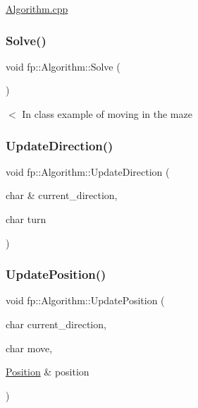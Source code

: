 \hyperlink{_algorithm_8cpp}{Algorithm.\+cpp} \mbox{\label{classfp_1_1_algorithm_ac6e4cae1f140d0155f2feaaaf1d287c1}} 
\subsubsection{\texorpdfstring{Solve()}{Solve()}}
{\footnotesize\ttfamily void fp\+::\+Algorithm\+::\+Solve (\begin{DoxyParamCaption}{ }\end{DoxyParamCaption})}

$<$ In class example of moving in the maze \mbox{\label{classfp_1_1_algorithm_ab91291b423ce58ba86e317112ca0c5ba}} 
\subsubsection{\texorpdfstring{Update\+Direction()}{UpdateDirection()}}
{\footnotesize\ttfamily void fp\+::\+Algorithm\+::\+Update\+Direction (\begin{DoxyParamCaption}\item[{char \&}]{current\+\_\+direction,  }\item[{char}]{turn }\end{DoxyParamCaption})}

\mbox{\label{classfp_1_1_algorithm_ad2d339d7e95c730bb5f44511fa3c1246}} 
\subsubsection{\texorpdfstring{Update\+Position()}{UpdatePosition()}}
{\footnotesize\ttfamily void fp\+::\+Algorithm\+::\+Update\+Position (\begin{DoxyParamCaption}\item[{char}]{current\+\_\+direction,  }\item[{char}]{move,  }\item[{\hyperlink{structfp_1_1_algorithm_1_1_position}{Position} \&}]{position }\end{DoxyParamCaption})}



